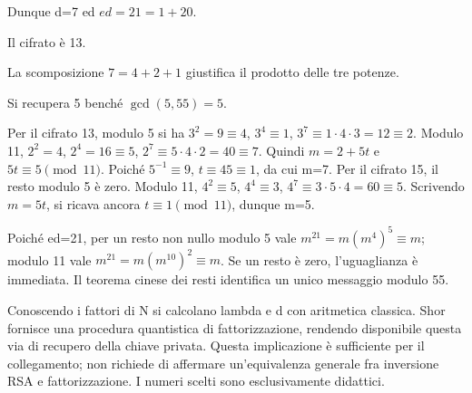 \ExSolution


Dunque d=7 ed \(ed=21=1+20\).


Il cifrato è 13.


La scomposizione \(7=4+2+1\) giustifica il prodotto delle tre potenze.


Si recupera 5 benché \(\gcd(5,55)=5\).


Per il cifrato 13, modulo 5 si ha \(3^2=9\equiv4\), \(3^4\equiv1\), \(3^7\equiv1\cdot4\cdot3=12\equiv2\). Modulo 11, \(2^2=4\), \(2^4=16\equiv5\), \(2^7\equiv5\cdot4\cdot2=40\equiv7\). Quindi \(m=2+5t\) e \(5t\equiv5\pmod{11}\). Poiché \(5^{-1}\equiv9\), \(t\equiv45\equiv1\), da cui m=7.
Per il cifrato 15, il resto modulo 5 è zero. Modulo 11, \(4^2\equiv5\), \(4^4\equiv3\), \(4^7\equiv3\cdot5\cdot4=60\equiv5\). Scrivendo \(m=5t\), si ricava ancora \(t\equiv1\pmod{11}\), dunque m=5.


Poiché ed=21, per un resto non nullo modulo 5 vale \(m^{21}=m(m^4)^5\equiv m\); modulo 11 vale \(m^{21}=m(m^{10})^2\equiv m\). Se un resto è zero, l’uguaglianza è immediata. Il teorema cinese dei resti identifica un unico messaggio modulo 55.


Conoscendo i fattori di N si calcolano lambda e d con aritmetica classica. Shor fornisce una procedura quantistica di fattorizzazione, rendendo disponibile questa via di recupero della chiave privata. Questa implicazione è sufficiente per il collegamento; non richiede di affermare un’equivalenza generale fra inversione RSA e fattorizzazione. I numeri scelti sono esclusivamente didattici.


